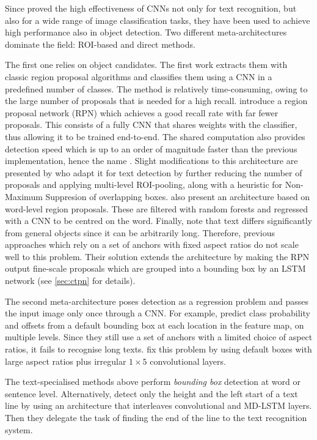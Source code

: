 		Since \citet{ciresan} proved the high effectiveness of CNNs not only for text recognition, but also for a wide range of image classification tasks, they have been used to achieve high performance also in object detection. Two different meta-architectures dominate the field: ROI-based and direct methods.

		The first one relies on object candidates. The first work \citep{fast_rcnn} extracts them with classic region proposal algorithms and classifies them using a CNN in a predefined number of classes. The method is relatively time-consuming, owing to the large number of proposals that is needed for a high recall.  introduce a region proposal network (RPN) which achieves a good recall rate with far fewer proposals. This consists of a fully CNN that shares weights with the classifier, thus allowing it to be trained end-to-end. The shared computation also provides detection speed which is up to an order of magnitude faster than the previous implementation, hence the name \FRCNN{}. Slight modifications to this architecture are presented by \citet{deeptext} who adapt it for text detection by further reducing the number of proposals and applying multi-level ROI-pooling, along with a heuristic for Non-Maximum Suppresion of overlapping boxes.  also present an architecture based on word-level region proposals. These are filtered with random forests and regressed with a CNN to be centred on the word. Finally, \citet{ctpn} note that text differs significantly from general objects since it can be arbitrarily long. Therefore, previous approaches which rely on a set of anchors with fixed aspect ratios do not scale well to this problem. Their solution extends the \FRCNN{} architecture by making the RPN output fine-scale proposals which are grouped into a bounding box by an LSTM network (see \autoref{sec:ctpn} for details).

		The second meta-architecture poses detection as a regression problem and passes the input image only once through a CNN. For example, \citet{ssd} predict class probability and offsets from a default bounding box at each location in the feature map, on multiple levels. Since they still use a set of anchors with a limited choice of aspect ratios, it fails to recognise long texts.  fix this problem by using default boxes with large aspect ratios plus irregular $1 \times 5$ convolutional layers.

		The text-specialised methods above perform \emph{bounding box} detection at word or sentence level. Alternatively, \citet{moysset_whereToStart} detect only the height and the left start of a text line by using an architecture that interleaves convolutional and MD-LSTM layers. Then they delegate the task of finding the end of the line to the text recognition system.

